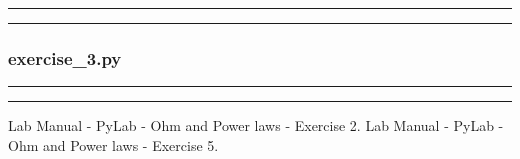 \documentclass[letterpaper,12pt]{article}
\begin{document}
\noindent\rule{\textwidth}{1pt}

\noindent\rule{\textwidth}{1pt}

\pagebreak

\subsubsection{exercise\_3.py}
\noindent\rule{\textwidth}{1pt}

\noindent\rule{\textwidth}{1pt}
\pagebreak

\begin{thebibliography}{99}

 Lab Manual - PyLab - Ohm and Power laws - Exercise 2.
 Lab Manual - PyLab - Ohm and Power laws - Exercise 5.

\end{thebibliography}
\end{document}
